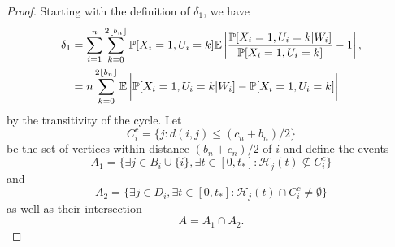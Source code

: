 	\begin{proof}
	Starting with the definition of $\delta_1$, we have
		\begin{align}
			\delta_1 &= %
			\sum_{i = 1}^n \sum_{k = 0}^{2 \lfloor b_n\rfloor} \prob[X_i = 1, U_i = k] \expect \left| \frac{\prob[X_i = 1, U_i = k|W_i]}{\prob[X_i = 1, U_i = k]} - 1 \right|,\\
			&= n \sum_{k = 0}^{2 \lfloor b_n\rfloor} \expect \left|\vphantom{\frac{1}{2}}\prob[X_i = 1, U_i = k|W_i] - \prob[X_i = 1, U_i = k] \right|%
			\label{eq: delta1 line 2}
		\end{align}
		by the transitivity of the cycle.
		Let
		\begin{equation}
			C_i^c = \{j : d(i,j) \leq (c_n + b_n)/2\}
		\end{equation}
		be the set of vertices within distance $(b_n + c_n)/2$ of $i$ and define the events
		\begin{equation}
			A_1 = \{\exists j \in B_i \cup \{i\}, \exists t \in [0, t_*] : \mathcal{H}_j(t) \nsubseteq  C_i^c\}
		\end{equation}
		and
		\begin{equation}
			A_2 = \{\exists j \in D_i, \exists t \in [0, t_*] : \mathcal{H}_j(t) \cap C_i^c \neq \emptyset\}
		\end{equation}
		as well as their intersection
		\begin{equation}
			A = A_1 \cap A_2.
		\end{equation}


\end{proof}
